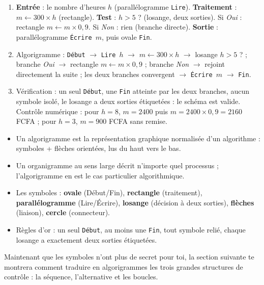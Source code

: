 \documentclass[11pt]{article}
\newcommand{\cle}[1]{{\popxbold\color{popdark}#1}}
\begin{document}
\begin{corrige}[Exercice 1]
\begin{enumerate}
\item \textbf{Entrée} : le nombre d'heures $h$ (parallélogramme \texttt{Lire}). \textbf{Traitement} : $m \leftarrow 300 \times h$ (rectangle). \textbf{Test} : $h > 5$ ? (losange, deux sorties). Si \emph{Oui} : rectangle $m \leftarrow m \times 0{,}9$. Si \emph{Non} : rien (branche directe). \textbf{Sortie} : parallélogramme \texttt{Écrire $m$}, puis ovale \texttt{Fin}.
\item Algorigramme : \texttt{Début} $\rightarrow$ \texttt{Lire $h$} $\rightarrow$ $m \leftarrow 300 \times h$ $\rightarrow$ losange $h > 5$ ? ; branche \emph{Oui} $\rightarrow$ rectangle $m \leftarrow m \times 0{,}9$ ; branche \emph{Non} $\rightarrow$ rejoint directement la suite ; les deux branches convergent $\rightarrow$ \texttt{Écrire $m$} $\rightarrow$ \texttt{Fin}.
\item Vérification : un seul \texttt{Début}, une \texttt{Fin} atteinte par les deux branches, aucun symbole isolé, le losange a deux sorties étiquetées : le schéma est valide. Contrôle numérique : pour $h = 8$, $m = 2400$ puis $m = 2400 \times 0{,}9 = \num{2160}$ FCFA ; pour $h = 3$, $m = 900$ FCFA sans remise.
\end{enumerate}
\end{corrige}

\begin{aretenir}
\begin{itemize}
\item Un \cle{algorigramme} est la représentation graphique normalisée d'un algorithme : symboles + flèches orientées, lus du haut vers le bas.
\item Un \cle{organigramme} au sens large décrit n'importe quel processus ; l'algorigramme en est le cas particulier algorithmique.
\item Les symboles : \textbf{ovale} (Début/Fin), \textbf{rectangle} (traitement), \textbf{parallélogramme} (Lire/Écrire), \textbf{losange} (décision à deux sorties), \textbf{flèches} (liaison), \textbf{cercle} (connecteur).
\item Règles d'or : un seul \texttt{Début}, au moins une \texttt{Fin}, tout symbole relié, chaque losange a exactement deux sorties étiquetées.
\end{itemize}
\end{aretenir}

Maintenant que les symboles n'ont plus de secret pour toi, la section suivante te montrera comment traduire en algorigrammes les trois grandes structures de contrôle : la séquence, l'alternative et les boucles.
\end{document}
